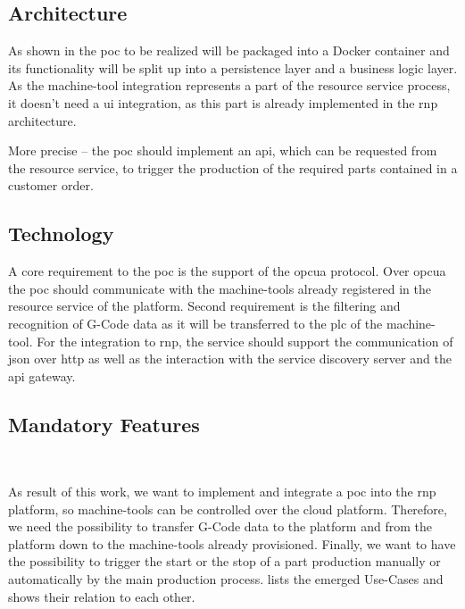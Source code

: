 \documentclass[
a4paper,
twoside,
headsepline,
cleardoublepage=empty,
parskip=half,
draft=false
]{scrbook}
\begin{document}
			\subsection{Architecture} \label{subsec:architecture}

				As shown in  the \gls{poc} to be realized will be packaged into a Docker container and its functionality will be split up into a persistence layer and a business logic layer.
				As the machine-tool integration represents a part of the resource service process, it doesn't need a \gls{ui} integration, as this part is already implemented in the \gls{rnp} architecture.

				More precise -- the \gls{poc} should implement an \gls{api}, which can be requested from the resource service, to trigger the production of the required parts contained in a customer order.

			\subsection{Technology} \label{subsec:technology}

				A core requirement to the \gls{poc} is the support of the \gls{opcua} protocol.
				Over \gls{opcua} the \gls{poc} should communicate with the machine-tools already registered in the resource service of the platform.
				Second requirement is the filtering and recognition of G-Code data as it will be transferred to the \gls{plc} of the machine-tool.
				For the integration to \gls{rnp}, the service should support the communication of \gls{json} over \gls{http} as well as the interaction with the service discovery server and the \gls{api} gateway.

			\subsection{Mandatory Features} \label{subsec:mandatory}

				As result of this work, we want to implement and integrate a \gls{poc} into the \gls{rnp} platform, so machine-tools can be controlled over the cloud platform.
				Therefore, we need the possibility to transfer G-Code data to the platform and from the platform down to the machine-tools already provisioned.
				Finally, we want to have the possibility to trigger the start or the stop of a part production manually or automatically by the main production process.  lists the emerged Use-Cases and shows their relation to each other.
\end{document}
